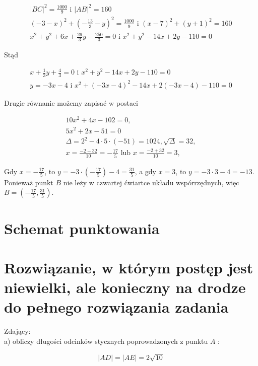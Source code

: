 \documentclass[10pt]{article}
\begin{document}
$$
\begin{gathered}
|B C|^{2}=\frac{1000}{9} \text { i }|A B|^{2}=160 \\
(-3-x)^{2}+\left(-\frac{13}{3}-y\right)^{2}=\frac{1000}{9} \text { i }(x-7)^{2}+(y+1)^{2}=160 \\
x^{2}+y^{2}+6 x+\frac{26}{3} y-\frac{250}{3}=0 \text { i } x^{2}+y^{2}-14 x+2 y-110=0
\end{gathered}
$$

Stąd

$$
\begin{gathered}
x+\frac{1}{3} y+\frac{4}{3}=0 \text { i } x^{2}+y^{2}-14 x+2 y-110=0 \\
y=-3 x-4 \text { i } x^{2}+(-3 x-4)^{2}-14 x+2(-3 x-4)-110=0
\end{gathered}
$$

Drugie równanie możemy zapisać w postaci

$$
\begin{gathered}
10 x^{2}+4 x-102=0, \\
5 x^{2}+2 x-51=0 \\
\Delta=2^{2}-4 \cdot 5 \cdot(-51)=1024, \sqrt{\Delta}=32, \\
x=\frac{-2-32}{10}=-\frac{17}{5} \text { lub } x=\frac{-2+32}{10}=3,
\end{gathered}
$$

Gdy $x=-\frac{17}{5}$, to $y=-3 \cdot\left(-\frac{17}{5}\right)-4=\frac{31}{5}$, a gdy $x=3$, to $y=-3 \cdot 3-4=-13$.\\
Ponieważ punkt $B$ nie leży w czwartej ćwiartce układu wspórrzędnych, więc $B=\left(-\frac{17}{5}, \frac{31}{5}\right)$.

\section*{Schemat punktowania}
\section*{Rozwiązanie, w którym postęp jest niewielki, ale konieczny na drodze do pełnego rozwiązania zadania}
Zdający:\\
a) obliczy długości odcinków stycznych poprowadzonych z punktu $A$ :

$$
|A D|=|A E|=2 \sqrt{10}
$$
\end{document}
